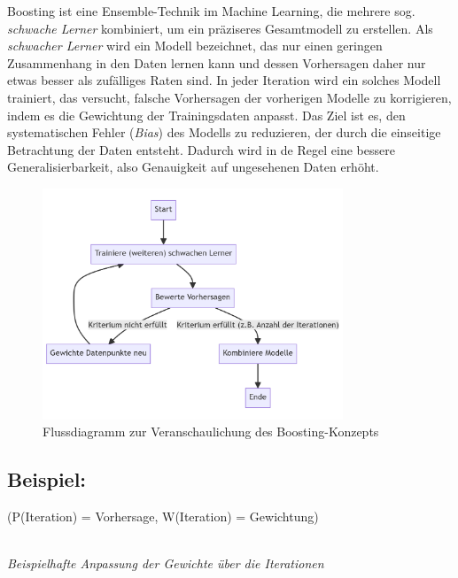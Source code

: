 Boosting ist eine Ensemble-Technik im Machine Learning, die mehrere sog. \emph{\glqq schwache Lerner\grqq} kombiniert,
um ein präziseres Gesamtmodell zu erstellen. Als \emph{schwacher Lerner} wird ein Modell bezeichnet, das nur einen geringen
Zusammenhang in den Daten lernen kann und dessen Vorhersagen daher nur etwas besser als zufälliges Raten sind.
In jeder Iteration wird ein solches Modell trainiert, das versucht, falsche
Vorhersagen der vorherigen Modelle zu korrigieren, indem es die Gewichtung der Trainingsdaten anpasst.
Das Ziel ist es, den systematischen Fehler (\emph{Bias}) des Modells zu reduzieren, der durch die einseitige
Betrachtung der Daten entsteht. Dadurch wird in de Regel eine bessere Generalisierbarkeit, also Genauigkeit auf
ungesehenen Daten erhöht.

\begin{figure}[h]
    \centering
    \includegraphics[width=0.8\textwidth]{"./figures/Boosting_Graph"}
    \caption{Flussdiagramm zur Veranschaulichung des Boosting-Konzepts}
\end{figure}

\subsection*{Beispiel:}
(P(Iteration) = Vorhersage, W(Iteration) = Gewichtung)\\
\begin{center}
    
    \\[5pt]
    \emph{Beispielhafte Anpassung der Gewichte über die Iterationen}
\end{center}
